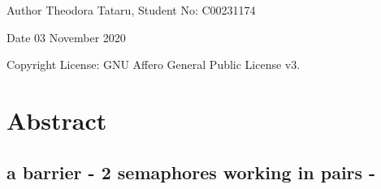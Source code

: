 \begin{DoxyAuthor}{Author}
Theodora Tataru, Student No\+: C00231174~\newline
 
\end{DoxyAuthor}
\begin{DoxyDate}{Date}
03 November 2020 
\end{DoxyDate}
\begin{DoxyCopyright}{Copyright}
License\+: G\+NU Affero General Public License v3. 
\end{DoxyCopyright}
\hypertarget{index_Abstract}{}\section{Abstract}\label{index_Abstract}
\hypertarget{index_Implementing}{}\subsection{a barrier -\/ 2 semaphores working in pairs -\/}\label{index_Implementing}
